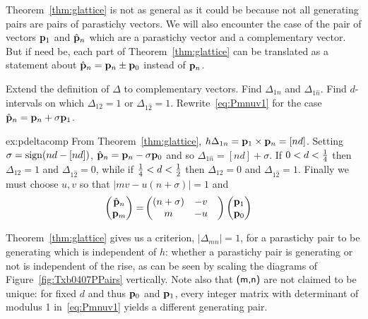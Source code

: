Theorem~\ref{thm:glattice} is not as general as it could be because not all generating pairs are pairs of parastichy vectors. We will also encounter the case of the pair of vectors 
${\mathbf p}_{1}$ and $\hat{\mathbf p}_{n}$ which are a parastichy vector and a complementary vector. But if need be, each part of Theorem~\ref{thm:glattice} can be translated as a statement about $\hat{\mathbf p}_{n}={\mathbf p}_{n}\pm{\mathbf p}_{0}$ instead of ${\mathbf p}_{n}$. 

\begin{jExercise}\label{ex:pdeltacomp}\label{ex:calcdelta}
Extend the definition of $\Delta$ to complementary vectors. 	Find   $\Delta_{1n}$ and $\Delta_{1\hat n}$. Find  $d$-intervals on which 
$\Delta_{12}=1$ or $\Delta_{1\hat 2}=1$. Rewrite~\eqref{eq:Pmnuv1} for the case $\hat{\mathbf p}_{n}={\mathbf p}_{n}+\sigma{\mathbf p}_{1}$.
\end{jExercise}
\begin{jAnswer}{ex:pdeltacomp}{
From Theorem~\ref{thm:glattice}, $h\Delta_{1n}={\mathbf p}_{1}\times{\mathbf p}_{n}=[nd]$.
Setting $\sigma=\mathrm{sign} (nd -[nd])$, $\hat{\mathbf p}_{n}={\mathbf p}_{n}-\sigma{\mathbf p}_{0}$ and so $\Delta_{1\hat n}=[nd]+\sigma$. 
If $0<d<\textstyle{\frac{1}{4}}$ then $\Delta_{12}=1$ and $\Delta_{1\hat2}=0$, while 
if  $\textstyle{\frac{1}{4}}<d<\textstyle{\frac{1}{2}}$ then  $\Delta_{12}=0$ and $\Delta_{1\hat2}=1$.
Finally we must choose $u,v$ so that $|mv -u(n+\sigma)|=1$ and
		\begin{align}\label{eq:Pmnuv1ex}
		\begin{pmatrix}
			\hat{\mathbf p}_{n} \\ {\mathbf p}_{m} 
		\end{pmatrix} = &
		\begin{pmatrix}
			(n+\sigma)  & - v 
			\\
			m &- u &
		\end{pmatrix}
		\begin{pmatrix}
			{\mathbf p}_{1}
			\\
			{\mathbf p}_{0}
		\end{pmatrix}
	\end{align}
}\end{jAnswer}

Theorem~\ref{thm:glattice} gives us a criterion, $|\Delta_{mn}|=1$, for a parastichy pair to be generating which is independent of $h$: whether a parastichy pair is generating or not is independent of the rise, as can be seen by scaling the diagrams of Figure~\ref{fig:Txb0407PPairs} vertically.  Note also that $\textsf{(m,n)}$ are not claimed to be unique: for fixed $d$ and thus ${\mathbf p}_{0}$ and ${\mathbf p}_{1}$, every integer matrix with determinant of modulus 1 in~\eqref{eq:Pmnuv1} yields a different generating pair.


